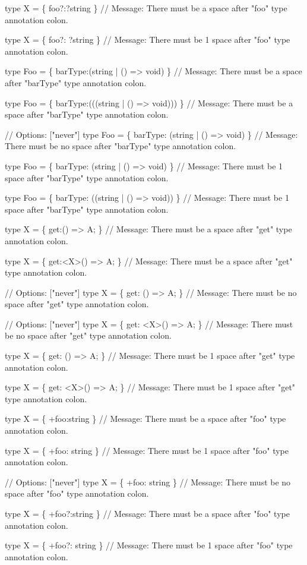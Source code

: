 \begin{DoxyCode}
type X = \{ foo?:?string \}
// Message: There must be a space after "foo" type annotation colon.

type X = \{ foo?:  ?string \}
// Message: There must be 1 space after "foo" type annotation colon.

type Foo = \{ barType:(string | () => void) \}
// Message: There must be a space after "barType" type annotation colon.

type Foo = \{ barType:(((string | () => void))) \}
// Message: There must be a space after "barType" type annotation colon.

// Options: ["never"]
type Foo = \{ barType: (string | () => void) \}
// Message: There must be no space after "barType" type annotation colon.

type Foo = \{ barType:  (string | () => void) \}
// Message: There must be 1 space after "barType" type annotation colon.

type Foo = \{ barType:  ((string | () => void)) \}
// Message: There must be 1 space after "barType" type annotation colon.

type X = \{ get:() => A; \}
// Message: There must be a space after "get" type annotation colon.

type X = \{ get:<X>() => A; \}
// Message: There must be a space after "get" type annotation colon.

// Options: ["never"]
type X = \{ get: () => A; \}
// Message: There must be no space after "get" type annotation colon.

// Options: ["never"]
type X = \{ get: <X>() => A; \}
// Message: There must be no space after "get" type annotation colon.

type X = \{ get:  () => A; \}
// Message: There must be 1 space after "get" type annotation colon.

type X = \{ get:  <X>() => A; \}
// Message: There must be 1 space after "get" type annotation colon.

type X = \{ +foo:string \}
// Message: There must be a space after "foo" type annotation colon.

type X = \{ +foo:  string \}
// Message: There must be 1 space after "foo" type annotation colon.

// Options: ["never"]
type X = \{ +foo: string \}
// Message: There must be no space after "foo" type annotation colon.

type X = \{ +foo?:string \}
// Message: There must be a space after "foo" type annotation colon.

type X = \{ +foo?:  string \}
// Message: There must be 1 space after "foo" type annotation colon.


\end{DoxyCode}
